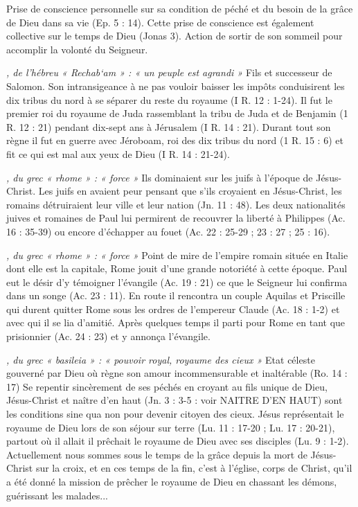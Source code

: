 \begin{multicols}{2}
\textit{}\newline
Prise de conscience personnelle sur sa condition de péché et du besoin de la grâce de Dieu dans sa vie (Ep. 5 : 14). Cette prise de conscience est également collective sur le temps de Dieu (Jonas 3). Action de sortir de son sommeil pour accomplir la volonté du Seigneur.

\textit{, de l'hébreu « Rechab`am » : « un peuple est agrandi »}\newline
Fils et successeur de Salomon. Son intransigeance à ne pas vouloir baisser les impôts conduisirent les dix tribus du nord à se séparer du reste du royaume (I R. 12 : 1-24). Il fut le premier roi du royaume de Juda rassemblant la tribu de Juda et de Benjamin (1 R. 12 : 21) pendant dix-sept ans à Jérusalem (I R. 14 : 21). Durant tout son règne il fut en guerre avec Jéroboam, roi des dix tribus du nord (1 R. 15 : 6) et fit ce qui est mal aux yeux de Dieu (I R. 14 : 21-24).

\textit{, du grec « rhome » : « force »}\newline
Ils dominaient sur les juifs à l'époque de Jésus-Christ. Les juifs en avaient peur pensant que s'ils croyaient en Jésus-Christ, les romains détruiraient leur ville et leur nation (Jn. 11 : 48). Les deux nationalités juives et romaines de Paul lui permirent de recouvrer la liberté à Philippes (Ac. 16 : 35-39) ou encore d'échapper au fouet (Ac. 22 : 25-29 ; 23 : 27 ; 25 : 16).


\textit{, du grec « rhome » : « force »}\newline
Point de mire de l'empire romain située en Italie dont elle est la capitale, Rome jouit d'une grande notoriété à cette époque. Paul eut le désir d'y témoigner l'évangile (Ac. 19 : 21) ce que le Seigneur lui confirma dans un songe (Ac. 23 : 11). En route il rencontra un couple Aquilas et Priscille qui durent quitter Rome sous les ordres de l'empereur Claude (Ac. 18 : 1-2) et avec qui il se lia d'amitié. Après quelques temps il parti pour Rome en tant que prisionnier (Ac. 24 : 23) et y annonça l'évangile.


\textit{, du grec « basileia » : « pouvoir royal, royaume des cieux »}\newline
Etat céleste gouverné par Dieu où règne son amour incommensurable et inaltérable (Ro. 14 : 17) Se repentir sincèrement de ses péchés en croyant au fils unique de Dieu, Jésus-Christ et naître d'en haut (Jn. 3 : 3-5 : voir NAITRE D'EN HAUT) sont les conditions sine qua non pour devenir citoyen des cieux. Jésus représentait le royaume de Dieu lors de son séjour sur terre (Lu. 11 : 17-20 ; Lu. 17 : 20-21), partout où il allait il prêchait le royaume de Dieu avec ses disciples (Lu. 9 : 1-2). Actuellement nous sommes sous le temps de la grâce depuis la mort de Jésus-Christ sur la croix, et en ces temps de la fin, c'est à l'église, corps de Christ, qu'il a été donné la mission de prêcher le royaume de Dieu en chassant les démons, guérissant les malades...


\end{multicols}
